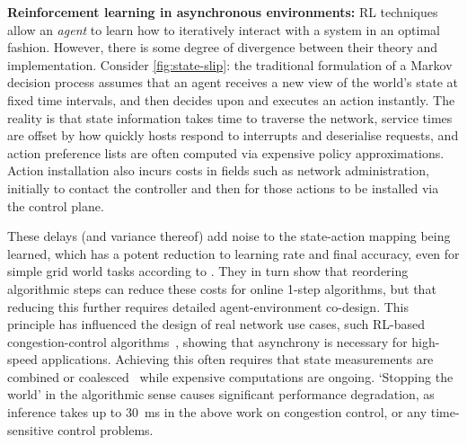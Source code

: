 \documentclass[sigconf,natbib=false]{acmart}
\newcommand{\fakepara}[1]{\noindent\textbf{#1:}}
\begin{document}
\fakepara{Reinforcement learning in asynchronous environments}
RL techniques allow an \emph{agent} to learn how to iteratively interact with a system in an optimal fashion.
However, there is some degree of divergence between their theory and implementation.
Consider \cref{fig:state-slip}: the traditional formulation of a Markov decision process assumes that an agent receives a new view of the world's state at fixed time intervals, and then decides upon and executes an action instantly.
The reality is that state information takes time to traverse the network, service times are offset by how quickly hosts respond to interrupts and deserialise requests, and action preference lists are often computed via expensive policy approximations.
Action installation also incurs costs in fields such as network administration, initially to contact the controller and then for those actions to be installed via the control plane.

These delays (and variance thereof) add noise to the state-action mapping being learned, which has a potent reduction to learning rate and final accuracy, even for simple grid world tasks according to \textcite{DBLP:journals/firai/TravnikMSP18}.
They in turn show that reordering algorithmic steps can reduce these costs for online 1-step algorithms, but that reducing this further requires detailed agent-environment co-design.
This principle has influenced the design of real network use cases, such RL-based congestion-control algorithms~\parencite{DBLP:journals/corr/abs-1910-04054}, showing that asynchrony is necessary for high-speed applications.
Achieving this often requires that state measurements are combined or coalesced~\parencite{DBLP:journals/corr/abs-1910-04054,DBLP:journals/tnsm/SimpsonRP20} while expensive computations are ongoing.
`Stopping the world' in the algorithmic sense causes significant performance degradation, as inference takes up to \SI{30}{\milli\second} in the above work on congestion control, or any time-sensitive control problems.
\end{document}
